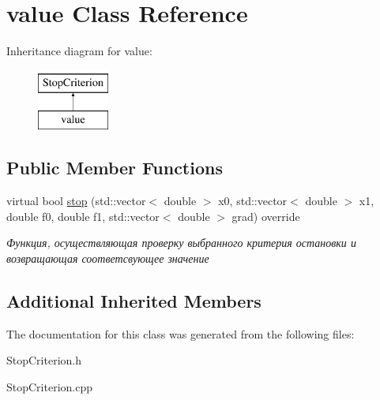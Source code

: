 \hypertarget{classvalue}{}\section{value Class Reference}
\label{classvalue}
Inheritance diagram for value\+:\begin{figure}[H]
\begin{center}
\leavevmode
\includegraphics[height=2.000000cm]{classvalue}
\end{center}
\end{figure}
\subsection*{Public Member Functions}
\begin{DoxyCompactItemize}
\item 
\mbox{\label{classvalue_a025d523b94d9124d42b7622ebfd7a09e}} 
virtual bool \mbox{\hyperlink{classvalue_a025d523b94d9124d42b7622ebfd7a09e}{stop}} (std\+::vector$<$ double $>$ x0, std\+::vector$<$ double $>$ x1, double f0, double f1, std\+::vector$<$ double $>$ grad) override
\begin{DoxyCompactList}\small\item\em Функция, осуществляющая проверку выбранного критерия остановки и возвращающая соответсвующее значение \end{DoxyCompactList}\end{DoxyCompactItemize}
\subsection*{Additional Inherited Members}


The documentation for this class was generated from the following files\+:\begin{DoxyCompactItemize}
\item 
Stop\+Criterion.\+h\item 
Stop\+Criterion.\+cpp\end{DoxyCompactItemize}
